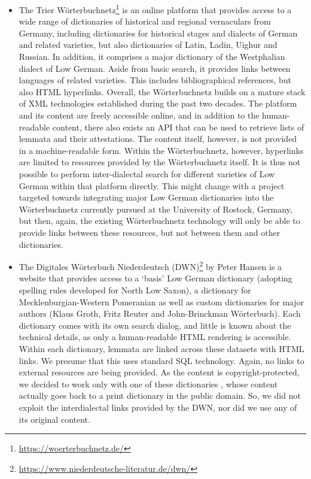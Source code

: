 \documentclass[11pt]{article}
\begin{document}
\begin{enumerate}
\begin{itemize}
\item The Trier Wörterbuchnetz\footnote{\url{https://woerterbuchnetz.de/}} is an online platform that provides access to a wide range of dictionaries of historical and regional vernaculars from Germany, including dictionaries for historical stages and dialects of German and related varieties, but also dictionaries of Latin, Ladin, Uighur and Russian. In addition, it comprises a major dictionary of the Westphalian dialect of Low German. Aside from basic search, it provides links between languages of related varieties. This includes bibliographical references, but also HTML hyperlinks. Overall, the Wörterbuchnetz builds on a mature stack of XML technologies established during the past two decades. The platform and its content are freely accessible online, and in addition to the human-readable content, there also exists an API that can be used to retrieve lists of lemmata and their attestations. The content itself, however, is not provided in a machine-readable form. Within the Wörterbuchnetz, however, hyperlinks are limited to resources provided by the Wörterbuchnetz itself. It is thus not possible to perform inter-dialectal search for different varieties of Low German within that platform directly. This might change with a project targeted towards integrating major Low German dictionaries into the Wörterbuchnetz currently pursued at the University of Rostock, Germany, but then, again, the existing Wörterbuchnetz technology will only be able to provide links between these resources, but not between them and other dictionaries.
\item The Digitales Wörterbuch Niederdeutsch (DWN)\footnote{\url{https://www.niederdeutsche-literatur.de/dwn/}} by Peter Hansen is a website that provides access to a `basis' Low German dictionary (adopting spelling rules developed for North Low Saxon), a dictionary for Mecklenburgian-Western Pomeranian as well as custom dictionaries for major authors (Klaus Groth, Fritz Reuter and John-Brinckman Wörterbuch). Each dictionary comes with its own search dialog, and little is known about the technical details, as only a human-readable HTML rendering is accessible. Within each dictionary, lemmata are linked across these datasets with HTML links. We presume that this uses standard SQL technology. Again, no links to external resources are being provided.
As the content is copyright-protected, we decided to work only with one of these dictionaries \citep{muller1904reuter}, whose content actually goes back to a print dictionary in the public domain. So, we did not exploit the interdialectal links provided by the DWN, nor did we use any of its original content.

\end{itemize}
\end{enumerate}
\end{document}
